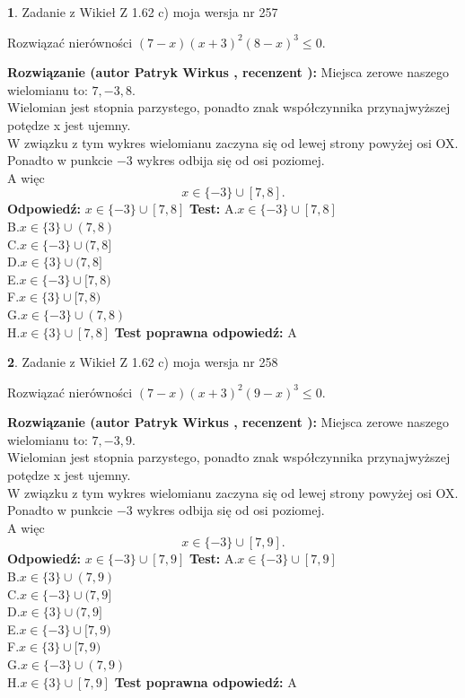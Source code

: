 \documentclass[12pt, a4paper]{article}
\theoremstyle{definition} %
\newtheorem{zad}{}
\newcommand{\zadStart}[1]{\begin{zad}#1\newline}
\newcommand{\zadStop}{\end{zad}}
\newcommand{\rozwStart}[2]{\noindent \textbf{Rozwiązanie (autor #1 , recenzent #2): }\newline}
\newcommand{\rozwStop}{\newline}
\newcommand{\odpStart}{\noindent \textbf{Odpowiedź:}\newline}
\newcommand{\odpStop}{\newline}
\newcommand{\testStart}{\noindent \textbf{Test:}\newline}
\newcommand{\testStop}{\newline}
\newcommand{\kluczStart}{\noindent \textbf{Test poprawna odpowiedź:}\newline}
\newcommand{\kluczStop}{\newline}
\begin{document}
\zadStart{Zadanie z Wikieł Z 1.62 c) moja wersja nr 257}

Rozwiązać nierówności $(7-x)(x+3)^{2}(8-x)^{3}\le0$.
\zadStop
\rozwStart{Patryk Wirkus}{}
Miejsca zerowe naszego wielomianu to: $7, -3, 8$.\\
Wielomian jest stopnia parzystego, ponadto znak współczynnika przy\linebreak najwyższej potędze x jest ujemny.\\ W związku z tym wykres wielomianu zaczyna się od lewej strony powyżej osi OX.\\
Ponadto w punkcie $-3$ wykres odbija się od osi poziomej.\\
A więc $$x \in \{-3\} \cup [7,8].$$
\rozwStop
\odpStart
$x \in \{-3\} \cup [7,8]$
\odpStop
\testStart
A.$x \in \{-3\} \cup [7,8]$\\
B.$x \in \{3\} \cup (7,8)$\\
C.$x \in \{-3\} \cup (7,8]$\\
D.$x \in \{3\} \cup (7,8]$\\
E.$x \in \{-3\} \cup [7,8)$\\
F.$x \in \{3\} \cup [7,8)$\\
G.$x \in \{-3\} \cup (7,8)$\\
H.$x \in \{3\} \cup [7,8]$
\testStop
\kluczStart
A
\kluczStop



\zadStart{Zadanie z Wikieł Z 1.62 c) moja wersja nr 258}

Rozwiązać nierówności $(7-x)(x+3)^{2}(9-x)^{3}\le0$.
\zadStop
\rozwStart{Patryk Wirkus}{}
Miejsca zerowe naszego wielomianu to: $7, -3, 9$.\\
Wielomian jest stopnia parzystego, ponadto znak współczynnika przy\linebreak najwyższej potędze x jest ujemny.\\ W związku z tym wykres wielomianu zaczyna się od lewej strony powyżej osi OX.\\
Ponadto w punkcie $-3$ wykres odbija się od osi poziomej.\\
A więc $$x \in \{-3\} \cup [7,9].$$
\rozwStop
\odpStart
$x \in \{-3\} \cup [7,9]$
\odpStop
\testStart
A.$x \in \{-3\} \cup [7,9]$\\
B.$x \in \{3\} \cup (7,9)$\\
C.$x \in \{-3\} \cup (7,9]$\\
D.$x \in \{3\} \cup (7,9]$\\
E.$x \in \{-3\} \cup [7,9)$\\
F.$x \in \{3\} \cup [7,9)$\\
G.$x \in \{-3\} \cup (7,9)$\\
H.$x \in \{3\} \cup [7,9]$
\testStop
\kluczStart
A
\kluczStop
\end{document}
